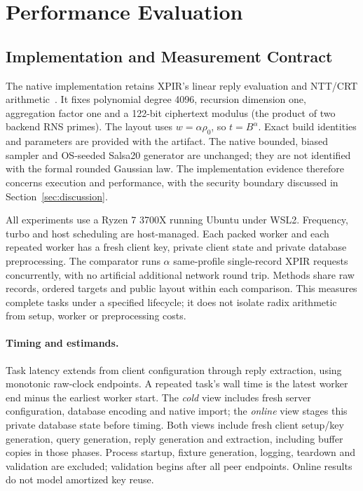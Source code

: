 \section{Performance Evaluation}
\label{sec:experimental-evaluation}
\subsection{Implementation and Measurement Contract}
The native implementation retains XPIR's linear reply evaluation and
NTT/CRT arithmetic~\cite{melchor2016xpir,xpir_github}. It fixes polynomial
degree 4096, recursion dimension one, aggregation factor one and a 122-bit
ciphertext modulus (the product of two backend RNS primes). The layout uses
\(w=\alpha\rho_0\), so \(t=B^\alpha\). Exact build identities and parameters
are provided with the artifact. The native bounded, biased sampler and
OS-seeded Salsa20 generator are unchanged; they are not identified with
the formal rounded Gaussian law. The implementation evidence therefore
concerns execution and performance, with the security boundary discussed
in Section~\ref{sec:discussion}.

All experiments use a Ryzen 7 3700X running Ubuntu under WSL2. Frequency,
turbo and host scheduling are host-managed. Each packed worker and each
repeated worker has a fresh client key, private client state and private
database preprocessing. The comparator runs \(\alpha\) same-profile
single-record XPIR requests concurrently, with no artificial additional
network round trip. Methods share raw records, ordered targets and public
layout within each comparison. This measures complete tasks under a
specified lifecycle; it does not isolate radix arithmetic from setup,
worker or preprocessing costs.

\paragraph{Timing and estimands.}
Task latency extends from client configuration through reply extraction,
using monotonic raw-clock endpoints. A repeated task's wall time is the
latest worker end minus the earliest worker start. The \emph{cold} view
includes fresh server configuration, database encoding and native import;
the \emph{online} view stages this private database state before timing.
Both views include fresh client setup/key generation, query generation,
reply generation and extraction, including buffer copies in those phases.
Process startup, fixture generation, logging, teardown and validation are
excluded; validation begins after all peer endpoints. Online results do
not model amortized key reuse.

